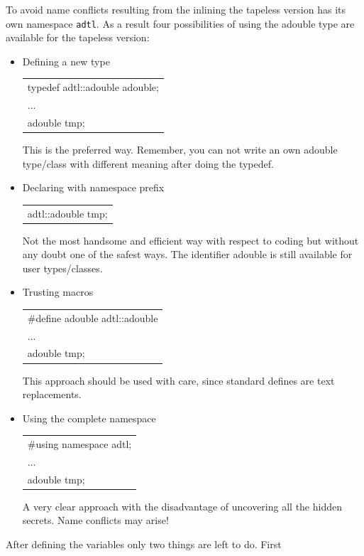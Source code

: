 \documentclass[11pt,twoside]{article}
\begin{document}
To avoid name conflicts
resulting from the inlining the tapeless version has its own namespace
\verb#adtl#. As a result four possibilities of using the {\sf adouble}
type are available for the tapeless version: 
\begin{itemize}
\item Defining a new type
      \begin{center}
	\begin{tabular}{l}
	  {\sf typedef adtl::adouble adouble;}\\
	  ...\\
	  {\sf adouble tmp;}
	\end{tabular}
      \end{center}
      This is the preferred way. Remember, you can not write an own
      {\sf adouble} type/class with different meaning after doing the typedef.
\item Declaring with namespace prefix
      \begin{center}
	\begin{tabular}{l}
	  {\sf adtl::adouble tmp;}
	\end{tabular}
      \end{center}
      Not the most handsome and efficient way with respect to coding
      but without any doubt one of the safest ways. The identifier
      {\sf adouble} is still available for user types/classes. 
\item Trusting macros
      \begin{center}
	\begin{tabular}{l}
	  {\sf \#define adouble adtl::adouble}\\
	  ...\\
	  {\sf adouble tmp;}
	\end{tabular}
      \end{center}
      This approach should be used with care, since standard defines are text replacements. 
  \item Using the complete namespace
        \begin{center}
	  \begin{tabular}{l}
	    {\sf \#using namespace adtl;}\\
	    ...\\
	    {\sf adouble tmp;}
	  \end{tabular}
	\end{center}
	A very clear approach with the disadvantage of uncovering all the hidden secrets. Name conflicts may arise!
\end{itemize}
After defining the variables only two things are left to do. First 
\end{document}
